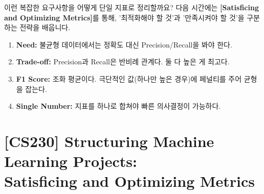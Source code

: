 \documentclass[11pt,a4paper]{book}
\theoremstyle{definition}
\begin{document}
이런 복잡한 요구사항을 어떻게 단일 지표로 정리할까요? 다음 시간에는 \textbf{[Satisficing and Optimizing Metrics]}를 통해, '최적화해야 할 것'과 '만족시켜야 할 것'을 구분하는 전략을 배웁니다.

\vspace{0.5cm}

\begin{summarybox}[title={단원 요약 (Cheat Sheet)}]
\begin{enumerate}
    \item \textbf{Need:} 불균형 데이터에서는 정확도 대신 Precision/Recall을 봐야 한다.
    \item \textbf{Trade-off:} Precision과 Recall은 반비례 관계다. 둘 다 높은 게 최고다.
    \item \textbf{F1 Score:} 조화 평균이다. 극단적인 값(하나만 높은 경우)에 페널티를 주어 균형을 잡는다.
    \item \textbf{Single Number:} 지표를 하나로 합쳐야 빠른 의사결정이 가능하다.
\end{enumerate}
\end{summarybox}


\chapter{[CS230] Structuring Machine Learning Projects: \\ Satisficing and Optimizing Metrics}
\label{ch:lecture24}

\end{document}

